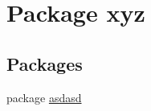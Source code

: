 \hypertarget{namespacexyz}{}\section{Package xyz}
\label{namespacexyz}
\subsection*{Packages}
\begin{DoxyCompactItemize}
\item 
package \hyperlink{namespacexyz_1_1asdasd}{asdasd}
\end{DoxyCompactItemize}
